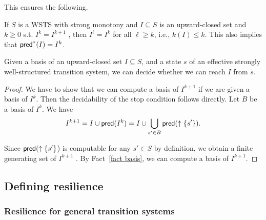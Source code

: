 This ensures the following.

\begin{fact}\label{stop condition}
If $S$ is a WSTS with strong monotony and $I \subseteq S$ is an upward-closed set and $k \geq 0$ s.t. $I^k = I^{k+1}$ , then $I^\ell = I^k$ for all $\ell \geq k$, i.e.,
$k(I) \leq k$. This also implies that $\textsf{pred}^*(I) = I^k$.
\end{fact}



\begin{lemma}
 Given a basis of an upward-closed set $I \subseteq S$, and a state $s$ of an effective strongly well-structured transition
system, we can decide whether we can reach $I$ from $s$.
\end{lemma}

\begin{proof}
We have to show that we can compute a basis of $I^{k+1}$ if we are given a basis of $I^k $. 
Then the
decidability of the stop condition follows directly. Let $B$ be a basis of $I^k$. 
We have
$$I^{k+1} = I \cup \textsf{pred}(I^k ) = I \cup
\bigcup_{s' \in B}
\textsf{pred}(\uparrow \{s' \}).$$

Since $\textsf{pred}(\uparrow \{s' \}$) is computable for any $s'\in S$ by definition, we obtain a finite generating set of $I^{k+1}$ . By
Fact~\ref{fact basis}, we can compute a basis of $I^{k+1}$.
\end{proof}
\subsection{Defining resilience}


\subsubsection{Resilience for general transition systems}


